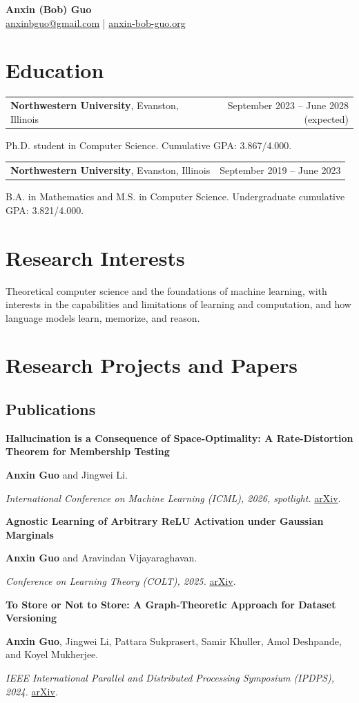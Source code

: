\documentclass[11pt,letterpaper]{article}
\makeatletter
\newcommand{\datedline}[2]{%
  \begin{tabularx}{\textwidth}{@{}X@{\hspace{0.8em}}r@{}}
    #1 & #2
  \end{tabularx}\par
}
\newcommand{\paperentry}[4]{%
  \Needspace{4\baselineskip}
  \textbf{#1}\par
  #2\par
  \emph{#3}#4\par
}
\newcommand{\papersep}{\vspace{0.72em}}
\makeatother
\begin{document}
\begin{center}
  {\LARGE \textbf{Anxin (Bob) Guo}}\\[0.25em]
  \href{mailto:anxinbguo@gmail.com}{anxinbguo@gmail.com}
  \quad|\quad
  \href{https://anxin-bob-guo.org}{anxin-bob-guo.org}
\end{center}

\section{Education}

\datedline{\textbf{Northwestern University}, Evanston, Illinois}{September 2023 -- June 2028 (expected)}
Ph.D. student in Computer Science. Cumulative GPA: 3.867/4.000.

\datedline{\textbf{Northwestern University}, Evanston, Illinois}{September 2019 -- June 2023}
B.A. in Mathematics and M.S. in Computer Science. Undergraduate cumulative GPA: 3.821/4.000.

\section{Research Interests}

Theoretical computer science and the foundations of machine learning, with interests in the capabilities and limitations of learning and computation, and how language models learn, memorize, and reason.

\section{Research Projects and Papers}

\subsection*{Publications}

\paperentry
{Hallucination is a Consequence of Space-Optimality: A Rate-Distortion Theorem for Membership Testing}
{\textbf{Anxin Guo} and Jingwei Li.}
{International Conference on Machine Learning (ICML), 2026, spotlight.}
{ \href{https://arxiv.org/abs/2602.00906}{arXiv}.}
\papersep

\paperentry
{Agnostic Learning of Arbitrary ReLU Activation under Gaussian Marginals}
{\textbf{Anxin Guo} and Aravindan Vijayaraghavan.}
{Conference on Learning Theory (COLT), 2025.}
{ \href{https://arxiv.org/abs/2411.14349}{arXiv}.}
\papersep

\paperentry
{To Store or Not to Store: A Graph-Theoretic Approach for Dataset Versioning}
{\textbf{Anxin Guo}, Jingwei Li, Pattara Sukprasert, Samir Khuller, Amol Deshpande, and Koyel Mukherjee.}
{IEEE International Parallel and Distributed Processing Symposium (IPDPS), 2024.}
{ \href{https://arxiv.org/abs/2402.11741}{arXiv}.}
\papersep
\end{document}
